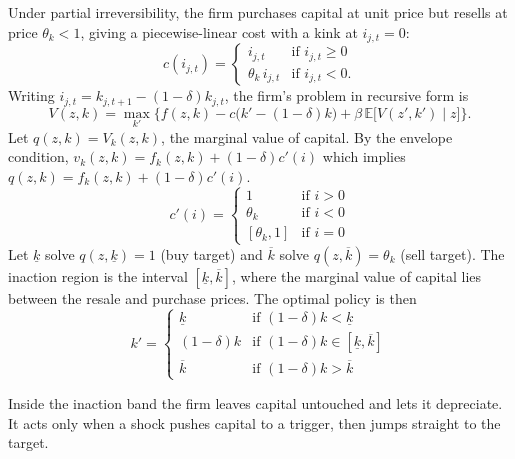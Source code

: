 Under partial irreversibility, the firm purchases capital at unit price but
resells at price $\theta_k < 1$, giving a piecewise-linear cost with a kink at
$i_{j,t}=0$:
\begin{equation}
    c(i_{j,t}) = \begin{cases}
        i_{j,t} & \text{if } i_{j,t} \ge 0 \\
        \theta_k \, i_{j,t} & \text{if } i_{j,t} < 0 .
    \end{cases}
\end{equation}
Writing $i_{j,t} = k_{j,t+1} - (1-\delta)k_{j,t}$, the firm's problem in
recursive form is
\begin{equation}
    V(z,k) = \max_{k'} \Big\{
        f(z,k) - c\big(k' - (1-\delta)k\big)
        + \beta \, \mathbb{E}\big[V(z',k') \mid z\big]
    \Big\} .
\end{equation}
Let $q(z,k) = V_k(z,k)$, the marginal value of capital. By the envelope condition,
$v_k(z,k) = f_k(z,k) + (1-\delta)c'(i)$ which implies $q(z,k) = f_k(z,k) + (1-\delta)c'(i)$.
\begin{equation}
    c'(i) = \begin{cases}
        1 & \text{if } i > 0 \\
        \theta_k & \text{if } i < 0 \\
        [\theta_k, 1] & \text{if } i = 0
    \end{cases}
\end{equation}
Let $\underline{k}$ solve $q(z,\underline{k}) = 1$ (buy target) and $\overline{k}$
solve $q(z,\overline{k}) = \theta_k$ (sell target). The inaction region is
the interval $[\underline{k}, \overline{k}]$, where the marginal value of capital
lies between the resale and purchase prices. The optimal policy is then
\begin{equation}
    k' = \begin{cases}
        \underline{k} & \text{if } (1-\delta)k < \underline{k} \\
        (1-\delta)k & \text{if } (1-\delta)k \in [\underline{k}, \overline{k}] \\
        \overline{k} & \text{if } (1-\delta)k > \overline{k}
    \end{cases}
\end{equation}

Inside the inaction band the firm leaves capital untouched and lets it depreciate. 
It acts only when a shock pushes capital to a trigger, then jumps straight to the 
target.

